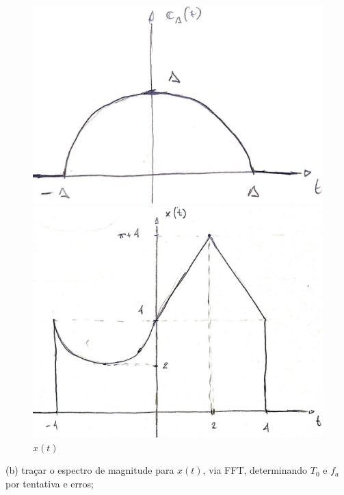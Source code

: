 \documentclass[10pt]{article}
\begin{document}
\begin{figure}[h]
\begin{minipage}{9cm}
        \caption{$r_{\Delta}(t)$}
    \end{minipage}
    \begin{minipage}{9.5cm}
        \includegraphics[scale=0.2]{questao2a3.jpeg}
        \centering
        \caption{$c_{\Delta}(t)$}
    \end{minipage}
    \begin{minipage}{9cm}
        \includegraphics[scale=0.2]{questao2a4.jpeg}
        \centering
        \caption{$x(t)$}
    \end{minipage}   
\end{figure}

(b) traçar o espectro de magnitude para $x(t)$, via FFT, determinando $T_0$ e $f_a$ por tentativa e erros;
\end{document}
